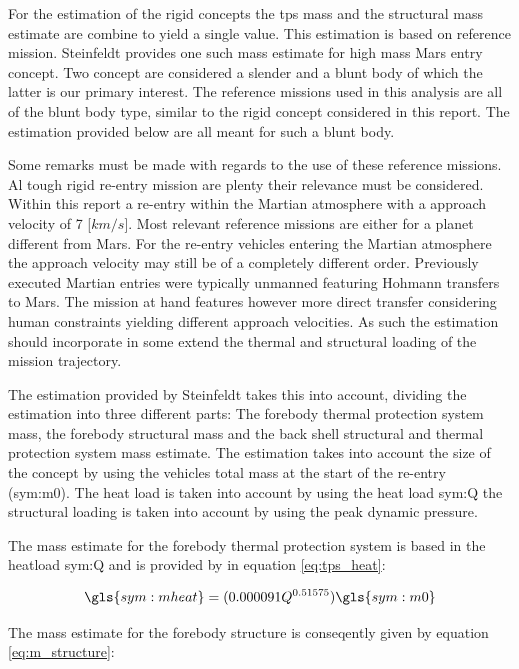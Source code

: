 For the estimation of the rigid concepts the \acrfull{tps} mass and the structural mass estimate are combine to yield a single value. This estimation is based on reference mission. Steinfeldt \cite{Steinfeldt2009} provides one such mass estimate for high mass Mars entry concept. Two concept are considered a slender and a blunt body of which the latter is our primary interest. The reference missions used in this analysis are all of the blunt body type, similar to the rigid concept considered in this report. The estimation provided below are all meant for such a blunt body.

Some remarks must be made with regards to the use of these reference missions. Al tough rigid re-entry mission are plenty their relevance must be considered. Within this report a re-entry within the Martian atmosphere with a approach velocity of 7 [$km/s$]. Most relevant reference missions are either for a planet different from Mars. For the re-entry vehicles entering the Martian atmosphere the approach velocity may still be of a completely different order. Previously executed Martian entries were typically unmanned featuring Hohmann transfers to Mars. The mission at hand features however more direct transfer considering human constraints yielding different approach velocities. As such the estimation should incorporate in some extend the thermal and structural loading of the mission trajectory.

The estimation provided by Steinfeldt takes this into account, dividing the estimation into three different parts: The forebody thermal protection system mass, the forebody structural mass and the back shell structural and thermal protection system mass estimate. The estimation takes into account the size of the concept by using the vehicles total mass at the start of the re-entry (\gls{sym:m0}). The heat load is taken into account by using the heat load \gls{sym:Q} the structural loading is taken into account by using the peak dynamic pressure.

The mass estimate for the forebody thermal protection system is based in the heatload \gls{sym:Q} and is provided by \cite{Laub2004} in equation \ref{eq:tps_heat}:

\begin{equation}
\gls{sym:mheat} = (0.000091Q^{0.51575})\gls{sym:m0}
\label{eq:tps_heat}
\end{equation}

The mass estimate for the forebody  structure is conseqently given by equation \ref{eq:m_structure}:

